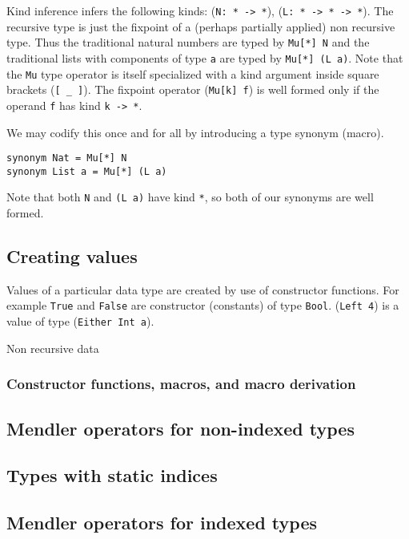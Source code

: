 Kind inference infers the following kinds:
(\verb+N: * -> *+),  (\verb+L: * -> * -> *+). 
The recursive type is just the fixpoint of a (perhaps partially applied)
non recursive type. Thus the traditional natural numbers are typed by \verb+Mu[*] N+
and the traditional lists with components of type \verb+a+ are typed by
\verb+Mu[*] (L a)+.  Note that the \verb+Mu+ type operator is itself specialized with a kind argument inside
square brackets (\verb+[ _ ]+). The fixpoint operator (\verb+Mu[k] f+) is well formed only
if the operand \verb+f+ has kind \verb+k -> *+. 

We may codify this once and for all by introducing
a type synonym (macro).

{\small
\begin{verbatim}
synonym Nat = Mu[*] N
synonym List a = Mu[*] (L a)     
\end{verbatim}}
Note that both \verb+N+ and \verb+(L a)+
have kind \verb+*+, so both of our synonyms are well formed.

\subsection{Creating values}

Values of a particular data type are created by use of constructor functions. For
example \verb+True+ and \verb+False+ are constructor (constants) of type \verb+Bool+.
(\verb+Left 4+) is a value of type (\verb+Either Int a+).


Non recursive
data

\subsubsection{Constructor functions, macros, and macro derivation}

\subsection{Mendler operators for non-indexed types}

\subsection{Types with static indices}\label{sec:bg:ixty}


\subsection{Mendler operators for indexed types}

